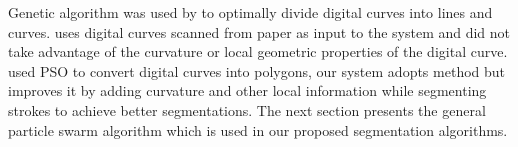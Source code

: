 \documentclass[a4paper,10pt]{IEEEconf}
\begin{document}
Genetic algorithm was used by \cite{CruveDivisionSwarm} to optimally divide digital curves into lines and curves. \citeauthor{CruveDivisionSwarm} uses digital curves scanned from paper as input to the system and did not take advantage of the curvature or local geometric properties of the digital curve. \citeauthor{PolygonApproximationPSO} \cite{PolygonApproximationPSO} used PSO to convert digital curves into polygons, our system adopts \citeauthor{PolygonApproximationPSO} method but improves it by adding curvature and other local information while segmenting strokes to achieve better segmentations. The next section presents the general particle swarm algorithm which is used in our proposed segmentation algorithms. %
\end{document}
